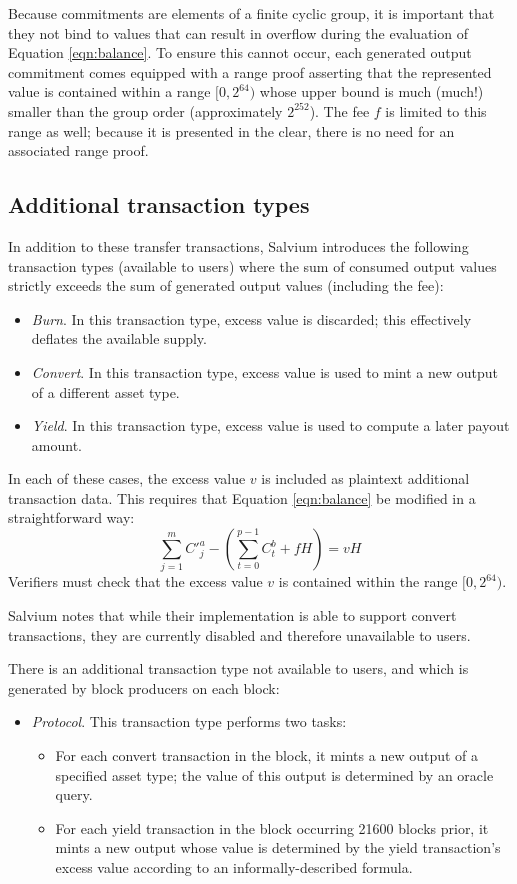 \documentclass{article}
\begin{document}
Because commitments are elements of a finite cyclic group, it is important that they not bind to values that can result in overflow during the evaluation of Equation \ref{eqn:balance}.
To ensure this cannot occur, each generated output commitment comes equipped with a range proof asserting that the represented value is contained within a range $[0, 2^{64})$ whose upper bound is much (much!) smaller than the group order (approximately $2^{252}$).
The fee $f$ is limited to this range as well; because it is presented in the clear, there is no need for an associated range proof.


\subsection{Additional transaction types}

In addition to these transfer transactions, Salvium introduces the following transaction types (available to users) where the sum of consumed output values strictly exceeds the sum of generated output values (including the fee):
\begin{itemize}
	\item \textit{Burn}. In this transaction type, excess value is discarded; this effectively deflates the available supply.
	\item \textit{Convert}. In this transaction type, excess value is used to mint a new output of a different asset type.
	\item \textit{Yield}. In this transaction type, excess value is used to compute a later payout amount.
\end{itemize}
In each of these cases, the excess value $v$ is included as plaintext additional transaction data.
This requires that Equation \ref{eqn:balance} be modified in a straightforward way:
$$\sum_{j=1}^m {C'}_j^a - \left( \sum_{t=0}^{p-1} C_t^b + f H \right) = v H$$
Verifiers must check that the excess value $v$ is contained within the range $[0, 2^{64})$.

Salvium notes that while their implementation is able to support convert transactions, they are currently disabled and therefore unavailable to users.

There is an additional transaction type not available to users, and which is generated by block producers on each block:
\begin{itemize}
	\item \textit{Protocol}. This transaction type performs two tasks:
	\begin{itemize}
		\item For each convert transaction in the block, it mints a new output of a specified asset type; the value of this output is determined by an oracle query.
		\item For each yield transaction in the block occurring 21600 blocks prior, it mints a new output whose value is determined by the yield transaction's excess value according to an informally-described formula.
	\end{itemize}
\end{itemize}
\end{document}
